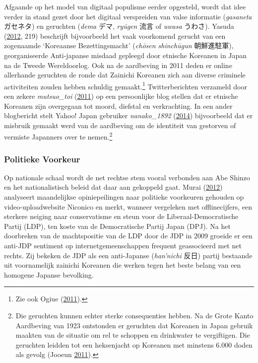 \documentclass[10.5pt,dutch,]{article}
\begin{document}
Afgaande op het model van digitaal populisme eerder opgesteld, wordt dat
idee verder in stand gezet door het digitaal verspreiden van valse
informatie (\emph{gasaneta} ガセネタ) en geruchten (\emph{dema} デマ,
\emph{ryūgen} 流言 of \emph{uwasa} うわさ). Yasuda
(\protect\hyperlink{ref-yasudaux5fnettoux5f2012}{2012}, 219) beschrijft
bijvoorbeeld het vaak voorkomend gerucht van een zogenaamde `Koreaanse
Bezettingsmacht' (\emph{chōsen shinchūgun} 朝鮮進駐軍), georganiseerde
Anti-japanse misdaad gepleegd door etnische Koreanen in Japan na de
Tweede Wereldoorlog. Ook na de aardbeving in 2011 deden er online
allerhande geruchten de ronde dat Zainichi Koreanen zich aan diverse
criminele activiteiten zouden hebben schuldig gemaakt.\footnote{Zie ook
  Ogiue (\protect\hyperlink{ref-ogiueux5fkenshoux5f2011}{2011}).}
Twitterberichten verzameld door een zekere \emph{mutsuo\_toi}
(\protect\hyperlink{ref-mutsuoux5ftoiux5fhigashinihonux5f2011}{2011}) op
een persoonlijke blog stellen dat er etnische Koreanen zijn overgegaan
tot moord, diefstal en verkrachting. In een ander blogbericht stelt
Yahoo! Japan gebruiker \emph{nanako\_1892}
(\protect\hyperlink{ref-nanakoux5f1892ux5fzainichikankokujinux5f2014}{2014})
bijvoorbeeld dat er misbruik gemaakt werd van de aardbeving om de
identiteit van gestorven of vermiste Japanners over te nemen.\footnote{Die
  geruchten kunnen echter sterke consequenties hebben. Na de Grote Kanto
  Aardbeving van 1923 ontstonden er geruchten dat Koreanen in Japan
  gebruik maakten van de situatie om rel te schoppen en drinkwater te
  vergiftigen. Die geruchten leidden tot een heksenjacht op Koreanen met
  minstens 6.000 doden als gevolg (Jooeun
  \protect\hyperlink{ref-jooeunux5fgreatux5f2011}{2011}).}

\subsubsection{Politieke Voorkeur}\label{politieke-voorkeur}

Op nationale schaal wordt de net rechtse stem vooral verbonden aan Abe
Shinzo en het nationalistisch beleid dat daar aan gekoppeld gaat. Murai
(\protect\hyperlink{ref-muraiux5fnetux5f2012}{2012}) analyseert
maandelijkse opiniepeilingen naar politieke voorkeuren gehouden op
video-uploadwebsite Niconico en merkt, wanneer vergeleken met
offlinecijfers, een sterkere neiging naar conservatisme en steun voor de
Liberaal-Democratische Partij (LDP), ten koste van de Democratische
Partij Japan (DPJ). Na het doorbreken van de machtspositie van de LDP
door de JDP in 2009 groeide er een anti-JDP sentiment op
internetgemeenschappen frequent geassocieerd met net rechts. Zij bekeken
de JDP als een anti-Japanse (\emph{han'nichi} 反日) partij bestaande uit
voornamelijk zainichi Koreanen die werken tegen het beste belang van een
homogene Japanse bevolking.
\end{document}
